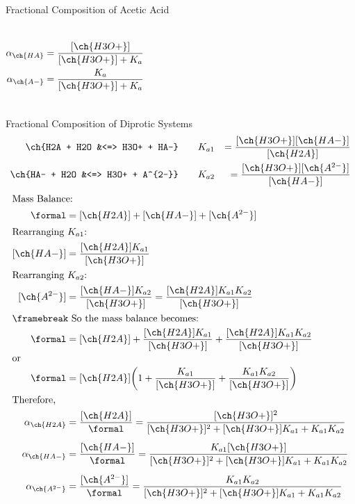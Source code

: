 \documentclass[notes=hide]{beamer}
\begin{document}
\begin{frame}{Fractional Composition of Acetic Acid}
	\begin{columns}
		\begin{align*}
			\alpha_{\ch{HA}} &= \frac{[\ch{H3O+}]}{[\ch{H3O+}] +
			K_a} \\
			\alpha_{\ch{A-}} &= \frac{K_a}{[\ch{H3O+}] + K_a}
		\end{align*}
		\begin{center}
		
		\end{center}
	\end{columns}
\end{frame}

\clearpage

\begin{frame}[allowframebreaks]{Fractional Composition of Diprotic Systems}
	\begin{align*}
		\ch{H2A + H2O &<=> H3O+ + HA-} \qquad &K_{a1} &=
		\frac{[\ch{H3O+}][\ch{HA-}]}{[\ch{H2A}]} \\
		\ch{HA- + H2O &<=> H3O+ + A^{2-}} \qquad &K_{a2} &=
		\frac{[\ch{H3O+}][\ch{A^{2-}}]}{[\ch{HA-}]}
	\end{align*}
	\begin{align*}
		\shortintertext{Mass Balance:}
		\si{\formal} &= [\ch{H2A}] + [\ch{HA-}] + [\ch{A^{2-}}] \\
		\shortintertext{Rearranging $K_{a1}$:}
		[\ch{HA-}] &= \frac{[\ch{H2A}]K_{a1}}{[\ch{H3O+}]} \\
		\shortintertext{Rearranging $K_{a2}$:}
		[\ch{A^{2-}}] &= \frac{[\ch{HA-}]K_{a2}}{[\ch{H3O+}]} =
		\frac{[\ch{H2A}]K_{a1}K_{a2}}{[\ch{H3O+}]} \\
		\shortintertext{\framebreak So the mass balance becomes:}
		\si{\formal} &= [\ch{H2A}] +
		\frac{[\ch{H2A}]K_{a1}}{[\ch{H3O+}]} +
		\frac{[\ch{H2A}]K_{a1}K_{a2}}{[\ch{H3O+}]} \\
		\shortintertext{or}
		\si{\formal} &= [\ch{H2A}]\bigg(1 + \frac{K_{a1}}{[\ch{H3O+}]}
		+ \frac{K_{a1}K_{a2}}{[\ch{H3O+}]}\bigg) \\
		\shortintertext{Therefore,}
		\alpha_{\ch{H2A}} &= \frac{[\ch{H2A}]}{\si{\formal}} =
		\frac{[\ch{H3O+}]^2}{[\ch{H3O+}]^2 + [\ch{H3O+}]K_{a1} +
		K_{a1}K_{a2}} \\[0.5em]
		\alpha_{\ch{HA-}} &= \frac{[\ch{HA-}]}{\si{\formal}} =
		\frac{K_{a1}[\ch{H3O+}]}{[\ch{H3O+}]^2 + [\ch{H3O+}]K_{a1} +
		K_{a1}K_{a2}} \\[0.5em]
		\alpha_{\ch{A^{2-}}} &= \frac{[\ch{A^{2-}}]}{\si{\formal}} =
		\frac{K_{a1}K_{a2}}{[\ch{H3O+}]^2 + [\ch{H3O+}]K_{a1} +
		K_{a1}K_{a2}}
	\end{align*}
\end{frame}
\end{document}
